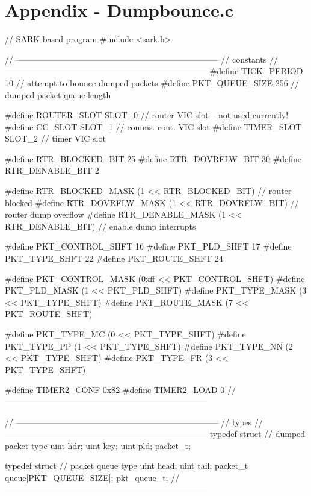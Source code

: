 \documentclass[oneside, a4paper, 11pt]{memoir}
\begin{document}
\chapter*{Appendix - Dumpbounce.c}
\begin{pyglist}[language=c]
// SARK-based program
#include <sark.h>

// ------------------------------------------------------------------------
// constants
// ------------------------------------------------------------------------
#define TICK_PERIOD        10      // attempt to bounce dumped packets
#define PKT_QUEUE_SIZE     256     // dumped packet queue length

#define ROUTER_SLOT        SLOT_0  // router VIC slot -- not used currently!
#define CC_SLOT            SLOT_1  // comms. cont. VIC slot
#define TIMER_SLOT         SLOT_2  // timer VIC slot

#define RTR_BLOCKED_BIT    25
#define RTR_DOVRFLW_BIT    30
#define RTR_DENABLE_BIT    2

#define RTR_BLOCKED_MASK   (1 << RTR_BLOCKED_BIT)   // router blocked
#define RTR_DOVRFLW_MASK   (1 << RTR_DOVRFLW_BIT)   // router dump overflow
#define RTR_DENABLE_MASK   (1 << RTR_DENABLE_BIT)   // enable dump interrupts

#define PKT_CONTROL_SHFT   16
#define PKT_PLD_SHFT       17
#define PKT_TYPE_SHFT      22
#define PKT_ROUTE_SHFT     24

#define PKT_CONTROL_MASK   (0xff << PKT_CONTROL_SHFT)
#define PKT_PLD_MASK       (1 << PKT_PLD_SHFT)
#define PKT_TYPE_MASK      (3 << PKT_TYPE_SHFT)
#define PKT_ROUTE_MASK     (7 << PKT_ROUTE_SHFT)

#define PKT_TYPE_MC        (0 << PKT_TYPE_SHFT)
#define PKT_TYPE_PP        (1 << PKT_TYPE_SHFT)
#define PKT_TYPE_NN        (2 << PKT_TYPE_SHFT)
#define PKT_TYPE_FR        (3 << PKT_TYPE_SHFT)

#define TIMER2_CONF        0x82
#define TIMER2_LOAD        0
// ------------------------------------------------------------------------


// ------------------------------------------------------------------------
// types
// ------------------------------------------------------------------------
typedef struct  // dumped packet type
{
uint hdr;
uint key;
uint pld;
} packet_t;


typedef struct  // packet queue type
{
uint head;
uint tail;
packet_t queue[PKT_QUEUE_SIZE];
} pkt_queue_t;
// ------------------------------------------------------------------------



\end{pyglist}
\end{document}
